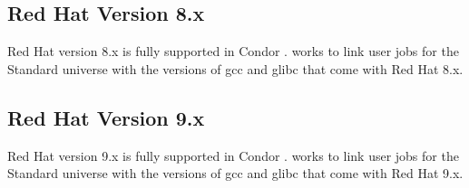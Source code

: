 \subsection{\label{sec:platform-linux-rh8}Red Hat Version 8.x}

Red Hat version 8.x is fully supported in Condor \VersionNotice.
 works to link user jobs for the Standard universe
with the versions of gcc and glibc that come with Red Hat 8.x.

\subsection{\label{sec:platform-linux-rh9}Red Hat Version 9.x}

Red Hat version 9.x is fully supported in Condor \VersionNotice.
 works to link user jobs for the Standard universe
with the versions of gcc and glibc that come with Red Hat 9.x.
